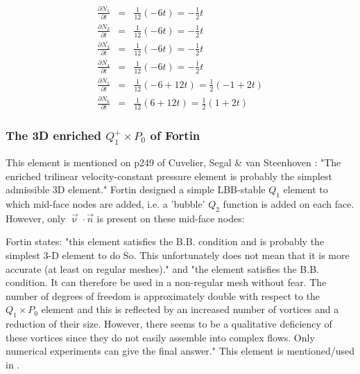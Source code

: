 \begin{eqnarray}
\frac{\partial N_1}{\partial t} &=& \frac{1}{12} (-6t) = -\frac{1}{2}t \\
\frac{\partial N_2}{\partial t} &=& \frac{1}{12} (-6t) = -\frac{1}{2}t \\
\frac{\partial N_3}{\partial t} &=& \frac{1}{12} (-6t) = -\frac{1}{2}t \\
\frac{\partial N_4}{\partial t} &=& \frac{1}{12} (-6t) = -\frac{1}{2}t \\
\frac{\partial N_5}{\partial t} &=& \frac{1}{12} (-6+12t) = \frac{1}{2} (-1+2t) \\ 
\frac{\partial N_6}{\partial t} &=& \frac{1}{12} (6+12t) = \frac{1}{2} (1+2t) 
\end{eqnarray}






\subsubsection{The 3D enriched $Q_1^+\times P_0$ of Fortin} \label{ss:Q1pP03D}

This element is mentioned on p249 of Cuvelier, Segal \& van Steenhoven \cite{cuss86}:
"The enriched trilinear velocity-constant pressure element is probably the simplest admissible 3D element."
Fortin \cite{fort81} designed a simple LBB-stable $Q_1$ element to which mid-face nodes are added, 
i.e. a 'bubble' $Q_2$ function is added on each face.
However, only $\vec\upnu\cdot \vec{n}$ is present on these mid-face nodes: 



Fortin states: "this element satisfies the B.B. condition and is probably the 
simplest 3-D element to do So. This
unfortunately does not mean that it is more accurate (at least on regular meshes)." and 
"the element satisfies the B.B. condition. It can therefore be used in a non-regular mesh 
without fear. The number of
degrees of freedom is approximately double with respect to the $Q_1\times P_0$ element and this is
reflected by an increased number of vortices and a reduction of their size. However, there
seems to be a qualitative deficiency of these vortices since they do not easily assemble into
complex flows. Only numerical experiments can give the final answer."
This element is mentioned/used in \cite{rota87b,begt92,vadv03}.

